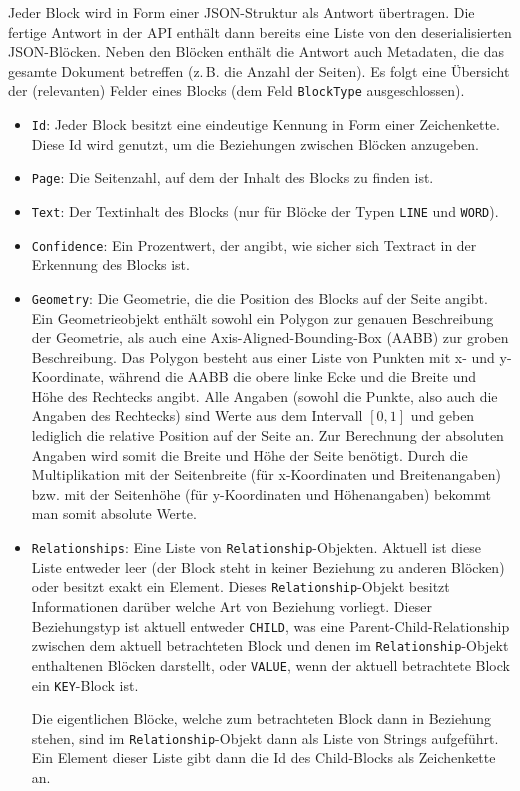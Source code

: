 \documentclass{whswinvcbook}
\begin{document}
Jeder Block wird in Form einer JSON-Struktur als Antwort übertragen. Die fertige Antwort in der API enthält dann bereits eine Liste von den deserialisierten JSON-Blöcken. Neben den Blöcken enthält die Antwort auch Metadaten, die das gesamte Dokument betreffen (z.\,B. die Anzahl der Seiten). Es folgt eine Übersicht der (relevanten) Felder eines Blocks (dem Feld \texttt{BlockType} ausgeschlossen).
\begin{itemize}
    \item \texttt{Id}: Jeder Block besitzt eine eindeutige Kennung in Form einer Zeichenkette. Diese Id wird genutzt, um die Beziehungen zwischen Blöcken anzugeben.
    \item \texttt{Page}: Die Seitenzahl, auf dem der Inhalt des Blocks zu finden ist.
    \item \texttt{Text}: Der Textinhalt des Blocks (nur für Blöcke der Typen \texttt{LINE} und \texttt{WORD}).
    \item \texttt{Confidence}: Ein Prozentwert, der angibt, wie sicher sich Textract in der Erkennung des Blocks ist.
    \item \texttt{Geometry}: Die Geometrie, die die Position des Blocks auf der Seite angibt. Ein Geometrieobjekt enthält sowohl ein Polygon zur genauen Beschreibung der Geometrie, als auch eine Axis-Aligned-Bounding-Box (AABB) zur groben Beschreibung. Das Polygon besteht aus einer Liste von Punkten mit x- und y-Koordinate, während die AABB die obere linke Ecke und die Breite und Höhe des Rechtecks angibt. Alle Angaben (sowohl die Punkte, also auch die Angaben des Rechtecks) sind Werte aus dem Intervall $[0,1]$ und geben lediglich die relative Position auf der Seite an. Zur Berechnung der absoluten Angaben wird somit die Breite und Höhe der Seite benötigt. Durch die Multiplikation mit der Seitenbreite (für x-Koordinaten und Breitenangaben) bzw. mit der Seitenhöhe (für y-Koordinaten und Höhenangaben) bekommt man somit absolute Werte.
    \item \texttt{Relationships}: Eine Liste von \texttt{Relationship}-Objekten. Aktuell ist diese Liste entweder leer (der Block steht in keiner Beziehung zu anderen Blöcken) oder besitzt exakt ein Element. Dieses \texttt{Relationship}-Objekt besitzt Informationen darüber welche Art von Beziehung vorliegt. Dieser Beziehungstyp ist aktuell entweder \texttt{CHILD}, was eine Parent-Child-Relationship zwischen dem aktuell betrachteten Block und denen im \texttt{Relationship}-Objekt enthaltenen Blöcken darstellt, oder \texttt{VALUE}, wenn der aktuell betrachtete Block ein \texttt{KEY}-Block ist.
    
    Die eigentlichen Blöcke, welche zum betrachteten Block dann in Beziehung stehen, sind im \texttt{Relationship}-Objekt dann als Liste von Strings aufgeführt. Ein Element dieser Liste gibt dann die Id des Child-Blocks als Zeichenkette an.
\end{itemize}
\end{document}
